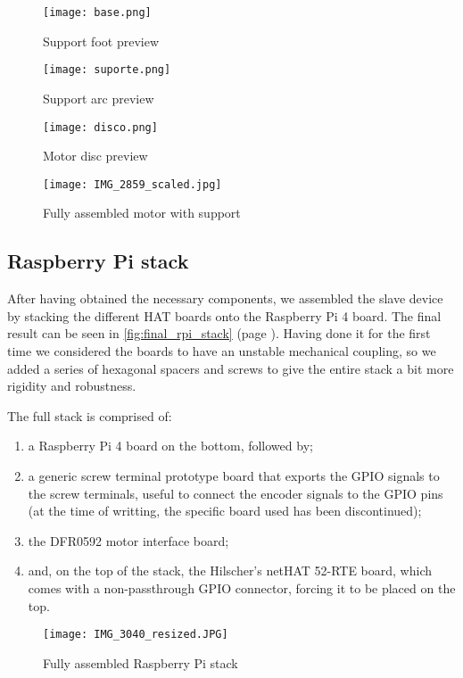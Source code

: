 \begin{figure}[t]
	\centering
	\texttt{[image: base.png]}
	\caption{Support foot preview}
	\label{fig:support_base}
\end{figure}
\begin{figure}[t]
	\centering
	\texttt{[image: suporte.png]}
	\caption{Support arc preview}
	\label{fig:support_arc}
\end{figure}
\begin{figure}[t]
	\centering
	\texttt{[image: disco.png]}
	\caption{Motor disc preview}
	\label{fig:support_disc}
\end{figure}
\begin{figure}[t]
	\centering
	\texttt{[image: IMG\_2859\_scaled.jpg]}
	\caption{Fully assembled motor with support}
	\label{fig:final_motor_stage}
\end{figure}

\subsection{Raspberry Pi stack}

After having obtained the necessary components, we assembled the slave device by stacking the different HAT boards onto the Raspberry Pi 4 board.
The final result can be seen in \autoref{fig:final_rpi_stack} (page \pageref{fig:final_rpi_stack}).
Having done it for the first time we considered the boards to have an unstable mechanical coupling, so we added a series of hexagonal spacers and screws to give the entire stack a bit more rigidity and robustness.

The full stack is comprised of:
\begin{enumerate}
	\item a Raspberry Pi 4 board \cite{product:rpi4} on the bottom, followed by;
	\item a generic screw terminal prototype board that exports the GPIO signals to the screw terminals, useful to connect the encoder signals to the GPIO pins (at the time of writting, the specific board used has been discontinued);
	\item the DFR0592 motor interface board;
	\item and, on the top of the stack, the Hilscher's netHAT 52-RTE board, which comes with a non-passthrough GPIO connector, forcing it to be placed on the top.
\end{enumerate}

\begin{figure}[t]
	\centering
	\texttt{[image: IMG\_3040\_resized.JPG]}
	\caption{Fully assembled Raspberry Pi stack}
	\label{fig:final_rpi_stack}
\end{figure}

